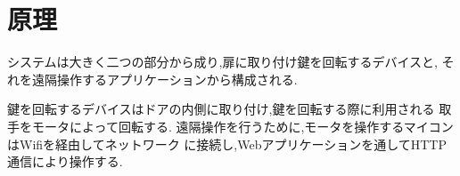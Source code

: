 \section{原理}
システムは大きく二つの部分から成り,扉に取り付け鍵を回転するデバイスと,
それを遠隔操作するアプリケーションから構成される.

鍵を回転するデバイスはドアの内側に取り付け,鍵を回転する際に利用される
取手をモータによって回転する.
遠隔操作を行うために,モータを操作するマイコンはWifiを経由してネットワーク
に接続し,Webアプリケーションを通してHTTP通信により操作する.

